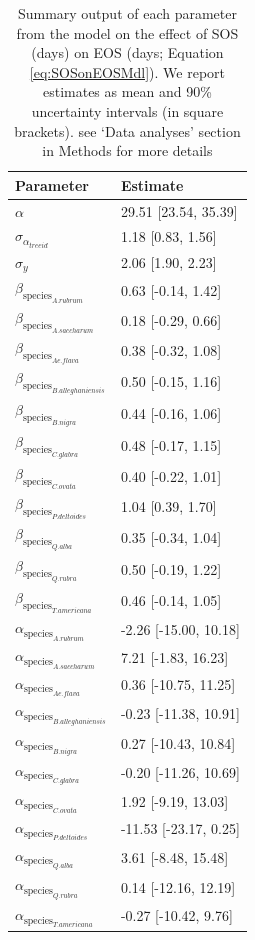\documentclass{article}\usepackage[]{graphicx}\usepackage[]{xcolor}
\begin{document}
\begin{table}[ht]
\centering
\caption{Summary output of each parameter from the model on the effect of SOS (days) on EOS (days; Equation \ref{eq:SOSonEOSMdl}). We report estimates as mean and 90\% uncertainty intervals (in square brackets). see `Data analyses' section in Methods for more details} 
\label{tab:tab_SOSonEOS}
\begin{tabular}{ll}
  \hline
Parameter & Estimate \\ 
  \hline
$\alpha$ & 29.51 [23.54, 35.39] \\ 
  $\sigma_{\alpha_{treeid}}$ & 1.18 [0.83, 1.56] \\ 
  $\sigma_{y}$ & 2.06 [1.90, 2.23] \\ 
  $\beta_{\text{species}_{A. rubrum}}$ & 0.63 [-0.14, 1.42] \\ 
  $\beta_{\text{species}_{A. saccharum}}$ & 0.18 [-0.29, 0.66] \\ 
  $\beta_{\text{species}_{Ae. flava}}$ & 0.38 [-0.32, 1.08] \\ 
  $\beta_{\text{species}_{B. alleghaniensis}}$ & 0.50 [-0.15, 1.16] \\ 
  $\beta_{\text{species}_{B. nigra}}$ & 0.44 [-0.16, 1.06] \\ 
  $\beta_{\text{species}_{C. glabra}}$ & 0.48 [-0.17, 1.15] \\ 
  $\beta_{\text{species}_{C. ovata}}$ & 0.40 [-0.22, 1.01] \\ 
  $\beta_{\text{species}_{P. deltoides}}$ & 1.04 [0.39, 1.70] \\ 
  $\beta_{\text{species}_{Q. alba}}$ & 0.35 [-0.34, 1.04] \\ 
  $\beta_{\text{species}_{Q. rubra}}$ & 0.50 [-0.19, 1.22] \\ 
  $\beta_{\text{species}_{T. americana}}$ & 0.46 [-0.14, 1.05] \\ 
  $\alpha_{\text{species}_{A. rubrum}}$ & -2.26 [-15.00, 10.18] \\ 
  $\alpha_{\text{species}_{A. saccharum}}$ & 7.21 [-1.83, 16.23] \\ 
  $\alpha_{\text{species}_{Ae. flava}}$ & 0.36 [-10.75, 11.25] \\ 
  $\alpha_{\text{species}_{B. alleghaniensis}}$ & -0.23 [-11.38, 10.91] \\ 
  $\alpha_{\text{species}_{B. nigra}}$ & 0.27 [-10.43, 10.84] \\ 
  $\alpha_{\text{species}_{C. glabra}}$ & -0.20 [-11.26, 10.69] \\ 
  $\alpha_{\text{species}_{C. ovata}}$ & 1.92 [-9.19, 13.03] \\ 
  $\alpha_{\text{species}_{P. deltoides}}$ & -11.53 [-23.17, 0.25] \\ 
  $\alpha_{\text{species}_{Q. alba}}$ & 3.61 [-8.48, 15.48] \\ 
  $\alpha_{\text{species}_{Q. rubra}}$ & 0.14 [-12.16, 12.19] \\ 
  $\alpha_{\text{species}_{T. americana}}$ & -0.27 [-10.42, 9.76] \\ 
   \hline
\end{tabular}
\end{table}
\end{document}
